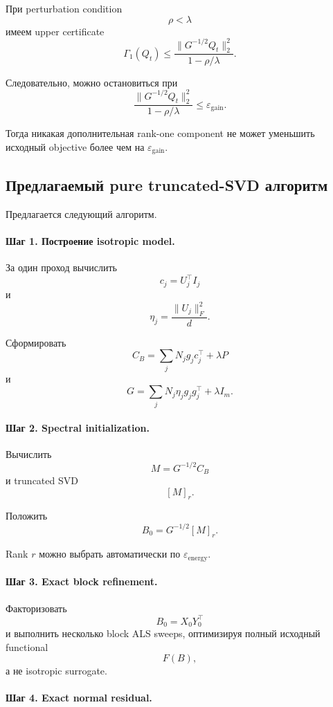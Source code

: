 При perturbation condition
\[
    \rho<\lambda
\]
имеем upper certificate
\[
\boxed{
    \Gamma_1(Q_t)
    \le
    \frac{
        \|G^{-1/2}Q_t\|_2^2
    }{
        1-\rho/\lambda
    }.
}
\]

Следовательно, можно остановиться при
\[
\boxed{
    \frac{
        \|G^{-1/2}Q_t\|_2^2
    }{
        1-\rho/\lambda
    }
    \le
    \varepsilon_{\mathrm{gain}}.
}
\]

Тогда никакая дополнительная rank-one component не может уменьшить
исходный objective более чем на
$\varepsilon_{\mathrm{gain}}$.

\subsection{Предлагаемый pure truncated-SVD алгоритм}

Предлагается следующий алгоритм.

\paragraph{Шаг 1. Построение isotropic model.}

За один проход вычислить
\[
    c_j=U_j^\top I_j
\]
и
\[
    \eta_j
    =
    \frac{\|U_j\|_F^2}{d}.
\]

Сформировать
\[
    C_B
    =
    \sum_j
    N_jg_jc_j^\top
    +
    \lambda P
\]
и
\[
    G
    =
    \sum_j
    N_j\eta_jg_jg_j^\top
    +
    \lambda I_m.
\]

\paragraph{Шаг 2. Spectral initialization.}

Вычислить
\[
    M=G^{-1/2}C_B
\]
и truncated SVD
\[
    [M]_r.
\]

Положить
\[
\boxed{
    B_0
    =
    G^{-1/2}[M]_r.
}
\]

Rank $r$ можно выбрать автоматически по
$\varepsilon_{\mathrm{energy}}$.

\paragraph{Шаг 3. Exact block refinement.}

Факторизовать
\[
    B_0=X_0Y_0^\top
\]
и выполнить несколько block ALS sweeps,
оптимизируя полный исходный functional
\[
    F(B),
\]
а не isotropic surrogate.

\paragraph{Шаг 4. Exact normal residual.}

